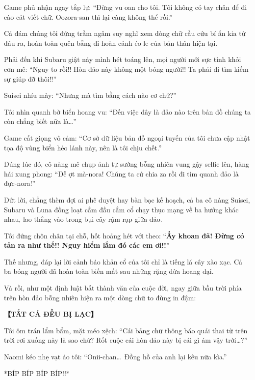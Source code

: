 \documentclass[../main.tex]{subfiles}
\begin{document}
Game phủ nhận ngay tắp lự: ``Đừng vu oan cho tôi. Tôi không có tay chân để đi cào cát viết chữ. Oozora-san thì lại càng không thể rồi.''

Cả đám chúng tôi đứng trầm ngâm suy nghĩ xem dòng chữ cầu cứu bí ẩn kia từ đâu ra, hoàn toàn quên bẵng đi hoàn cảnh éo le của bản thân hiện tại.

Phải đến khi Subaru giật nảy mình hét toáng lên, mọi người mới sực tỉnh khỏi cơn mê: ``Nguy to rồi!! Hòn đảo này không một bóng người!! Ta phải đi tìm kiếm sự giúp đỡ thôi!!''

Suisei nhíu mày: ``Nhưng mà tìm bằng cách nào cơ chứ?''

Tôi nhìn quanh bờ biển hoang vu: ``Đến việc đây là đảo nào trên bản đồ chúng ta còn chẳng biết nữa là\dots''

Game cất giọng vô cảm: ``Cơ sở dữ liệu bản đồ ngoại tuyến của tôi chưa cập nhật tọa độ vùng biển hẻo lánh này, nên là tôi chịu chết.''

Đúng lúc đó, cô nàng mê chụp ảnh tự sướng bỗng nhiên vung gậy selfie lên, hăng hái xung phong: ``Dễ ợt mà-nora! Chúng ta cứ chia za rồi đi tìm quanh đảo là đực-nora!''

Dứt lời, chẳng thèm đợi ai phê duyệt hay bàn bạc kế hoạch, cả ba cô nàng Suisei, Subaru và Luna đồng loạt cắm đầu cắm cổ chạy thục mạng về ba hướng khác nhau, lao thẳng vào trong bụi cây rậm rạp giữa đảo.


Tôi đứng chôn chân tại chỗ, hốt hoảng hét với theo: ``\textbf{Ấy khoan đã! Đừng có tản ra như thế!! Nguy hiểm lắm đó các em ơi!!}''

Thế nhưng, đáp lại lời cảnh báo khản cổ của tôi chỉ là tiếng lá cây xào xạc. Cả ba bóng người đã hoàn toàn biến mất sau những rặng dừa hoang dại.

Và rồi, như một định luật bất thành văn của cuộc đời, ngay giữa bầu trời phía trên hòn đảo bỗng nhiên hiện ra một dòng chữ to đùng in đậm:

\begin{center}
  \textbf{【TẤT CẢ ĐỀU BỊ LẠC】}
\end{center}

Tôi ôm trán lẩm bẩm, mặt méo xệch: ``Cái bảng chữ thông báo quái thai từ trên trời rơi xuống này là sao chứ? Rốt cuộc cái hòn đảo này bị cái gì ám vậy trời\dots?''

Naomi kéo nhẹ vạt áo tôi: ``Onii-chan\dots\ Đồng hồ của anh lại kêu nữa kìa.''

*BÍP BÍP BÍP BÍP!!*
\end{document}
